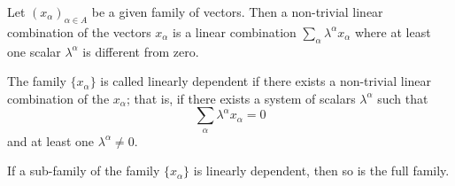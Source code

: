 Let $(x_\alpha)_{\alpha \in A}$ be a given family of vectors. Then a non-trivial linear combination of the vectors $x_\alpha$ is a linear combination $\sum_\alpha \lambda^\alpha x_\alpha$ where at least one scalar $\lambda^\alpha$ is different from zero.

The family $\{x_\alpha\}$ is called linearly dependent if there exists a non-trivial linear combination of the $x_\alpha$; that is, if there exists a system of scalars $\lambda^\alpha$ such that
$$\sum_\alpha \lambda^\alpha x_\alpha = 0$$
and at least one $\lambda^\alpha \neq 0$.

If a sub-family of the family $\{x_\alpha\}$ is linearly dependent, then so is the full family.
